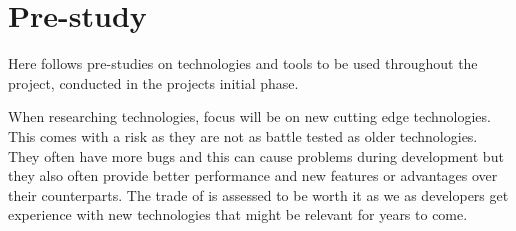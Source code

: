 \chapter{Pre-study}
Here follows pre-studies on technologies and tools to be used throughout the project, conducted in the projects initial phase.

When researching technologies, focus will be on new cutting edge technologies. 
This comes with a risk as they are not as battle tested as older technologies. 
They often have more bugs and this can cause problems during development but they also often provide better performance and new features or advantages over their counterparts. 
The trade of is assessed to be worth it as we as developers get experience with new technologies that might be relevant for years to come.









